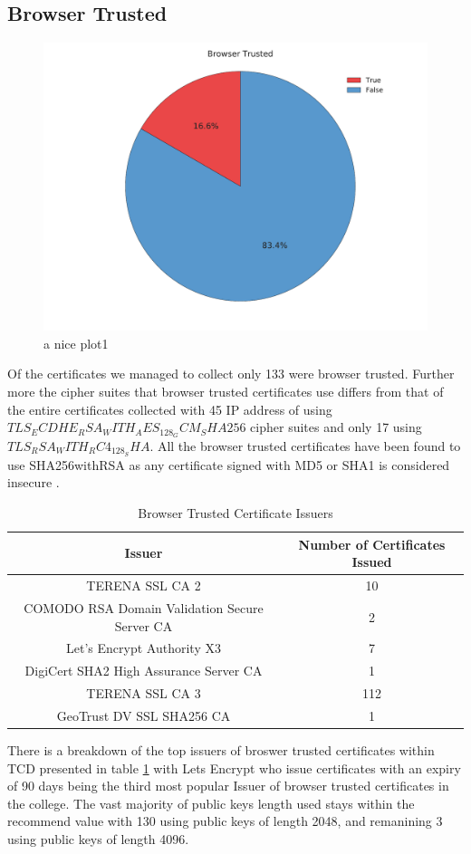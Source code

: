\documentclass[a4wide,leqno,12pt]{report}
\begin{document}
\subsection{Browser Trusted}
\begin{figure}[H]
\centering
\includegraphics[scale=.5]{pdf_images/BrowserTrusted}
\caption{a nice plot1}
\label{fig:browserTrusted}
\end{figure}
Of the certificates we managed to collect only 133 were browser trusted. Further more the cipher suites that browser trusted certificates use differs from that of the entire certificates collected with 45 IP address of using  $TLS_ECDHE_RSA_WITH_AES_128_GCM_SHA256$ cipher suites and only 17 using $TLS_RSA_WITH_RC4_128_SHA$. All the browser trusted certificates have been found to use SHA256withRSA as any certificate signed with MD5 or SHA1 is considered insecure \cite{ssllabs}.

\begin{table}[H]
\centering
\begin{tabular}{|| c c ||}
 \hline
  Issuer & Number of Certificates Issued  \\ [0.5ex]
 \hline\hline
TERENA SSL CA 2 & 10\\
COMODO RSA Domain Validation Secure Server CA &	2\\
Let's Encrypt Authority X3 & 7\\
DigiCert SHA2 High Assurance Server CA & 1\\
TERENA SSL CA 3 & 112 \\
GeoTrust DV SSL SHA256 CA & 1 \\[1ex]
 \hline
\end{tabular}
\caption{Browser Trusted Certificate Issuers }
\label{table:Browser_Trusted_Issuers}
\end{table}
There is a breakdown of the top issuers of broswer trusted certificates within TCD presented in table \ref{table:Browser_Trusted_Issuers} with Lets Encrypt who issue certificates with an expiry of 90 days \cite{LetsEncrypt} being the third most popular Issuer of browser trusted certificates in the college. The vast majority of public keys length used stays within the recommend value \cite{ssllabs} with 130 using public keys of length 2048, and remanining 3 using public keys of length 4096.
\end{document}
